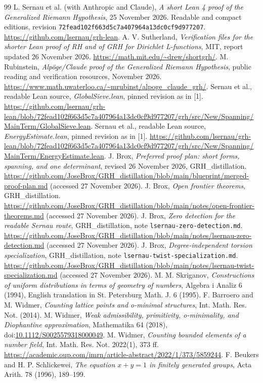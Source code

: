 \documentclass[11pt,a4paper]{article}
\begin{document}
\begin{thebibliography}{99}
 L. Sernau et al. (with Anthropic and Claude), \emph{A short Lean 4 proof of the Generalized Riemann Hypothesis}, 25 November 2026. Readable and compact editions, revision \texttt{72fead102f663d5c7a407964a13dc0cf9d977207}. \url{https://github.com/lsernau/grh-lean}.
 A. V. Sutherland, \emph{Verification files for the shorter Lean proof of RH and of GRH for Dirichlet L-functions}, MIT, report updated 26 November 2026. \url{https://math.mit.edu/~drew/shortgrh/}.
 M. Rubinstein, \emph{Alp\"oge/Claude proof of the Generalized Riemann Hypothesis}, public reading and verification resources, November 2026. \url{https://www.math.uwaterloo.ca/~mrubinst/alpoge_claude_grh/}.
 Sernau et al., readable Lean source, \emph{GlobalSieve.lean}, pinned revision as in [1]. \url{https://github.com/lsernau/grh-lean/blob/72fead102f663d5c7a407964a13dc0cf9d977207/grh/src/New/Spanning/MainTerm/GlobalSieve.lean}.
 Sernau et al., readable Lean source, \emph{EnergyEstimate.lean}, pinned revision as in [1]. \url{https://github.com/lsernau/grh-lean/blob/72fead102f663d5c7a407964a13dc0cf9d977207/grh/src/New/Spanning/MainTerm/EnergyEstimate.lean}.
 J. Brox, \emph{Preferred proof plan: short forms, spanning, and one determinant}, revised 26 November 2026, GRH\_distillation. \url{https://github.com/JoseBrox/GRH_distillation/blob/main/blueprint/merged-proof-plan.md} (accessed 27 November 2026).
 J. Brox, \emph{Open frontier theorems}, GRH\_distillation. \url{https://github.com/JoseBrox/GRH_distillation/blob/main/notes/open-frontier-theorems.md} (accessed 27 November 2026).
 J. Brox, \emph{Zero detection for the readable Sernau route}, GRH\_distillation, note \texttt{lsernau-zero-detection.md}. \url{https://github.com/JoseBrox/GRH_distillation/blob/main/notes/lsernau-zero-detection.md} (accessed 27 November 2026).
 J. Brox, \emph{Degree-independent torsion specialization}, GRH\_distillation, note \texttt{lsernau-twist-specialization.md}. \url{https://github.com/JoseBrox/GRH_distillation/blob/main/notes/lsernau-twist-specialization.md} (accessed 27 November 2026).
 M. M. Skriganov, \emph{Constructions of uniform distributions in terms of geometry of numbers}, Algebra i Analiz 6 (1994), English translation in St. Petersburg Math. J. 6 (1995).
 F. Barroero and M. Widmer, \emph{Counting lattice points and o-minimal structures}, Int. Math. Res. Not. (2014).
 M. Widmer, \emph{Weak admissibility, primitivity, o-minimality, and Diophantine approximation}, Mathematika 64 (2018), doi:\href{https://doi.org/10.1112/S0025579318000049}{10.1112/S0025579318000049}.
 M. Widmer, \emph{Counting bounded elements of a number field}, Int. Math. Res. Not. 2022(1), 373 ff. \url{https://academic.oup.com/imrn/article-abstract/2022/1/373/5859244}.
 F. Beukers and H. P. Schlickewei, \emph{The equation $x+y=1$ in finitely generated groups}, Acta Arith. 78 (1996), 189--199.
\end{thebibliography}
\end{document}
